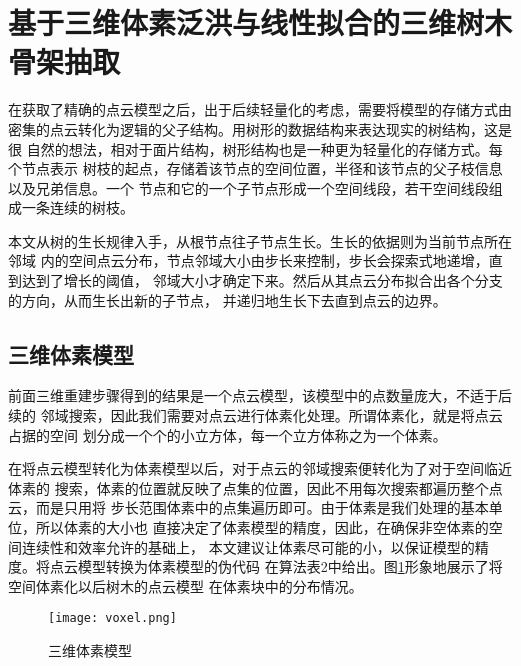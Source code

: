 
\section{基于三维体素泛洪与线性拟合的三维树木骨架抽取}
\label{sec:sklextract}
在获取了精确的点云模型之后，出于后续轻量化的考虑，需要将模型的存储方式由
密集的点云转化为逻辑的父子结构。用树形的数据结构来表达现实的树结构，这是很
自然的想法，相对于面片结构，树形结构也是一种更为轻量化的存储方式。每个节点表示
树枝的起点，存储着该节点的空间位置，半径和该节点的父子枝信息以及兄弟信息。一个
节点和它的一个子节点形成一个空间线段，若干空间线段组成一条连续的树枝。

本文从树的生长规律入手，从根节点往子节点生长。生长的依据则为当前节点所在邻域
内的空间点云分布，节点邻域大小由步长来控制，步长会探索式地递增，直到达到了增长的阈值，
邻域大小才确定下来。然后从其点云分布拟合出各个分支的方向，从而生长出新的子节点，
并递归地生长下去直到点云的边界。

\subsection{三维体素模型}
前面三维重建步骤得到的结果是一个点云模型，该模型中的点数量庞大，不适于后续的
邻域搜索，因此我们需要对点云进行体素化处理。所谓体素化，就是将点云占据的空间
划分成一个个的小立方体，每一个立方体称之为一个体素。

在将点云模型转化为体素模型以后，对于点云的邻域搜索便转化为了对于空间临近体素的
搜索，体素的位置就反映了点集的位置，因此不用每次搜索都遍历整个点云，而是只用将
步长范围体素中的点集遍历即可。由于体素是我们处理的基本单位，所以体素的大小也
直接决定了体素模型的精度，因此，在确保非空体素的空间连续性和效率允许的基础上，
本文建议让体素尽可能的小，以保证模型的精度。将点云模型转换为体素模型的伪代码
在算法表2中给出。图\ref{fig:voxel}形象地展示了将空间体素化以后树木的点云模型
在体素块中的分布情况。

\begin{figure}[H]
	\centering
	\texttt{[image: voxel.png]}
	\caption{三维体素模型}
	\label{fig:voxel}
\end{figure}

